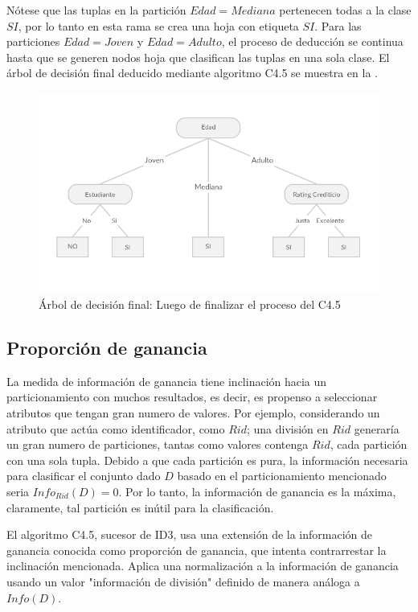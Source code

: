 Nótese que las tuplas en la partición $Edad = Mediana$ pertenecen todas a la clase $SI$, por lo tanto en esta rama se crea una hoja con etiqueta $SI$. Para las particiones $Edad = Joven$ y $Edad = Adulto$, el proceso de deducción se continua hasta que se generen nodos hoja que clasifican las tuplas en una sola clase. El
 árbol de decisión final deducido mediante algoritmo C4.5 se muestra en la .
 
\begin{figure}[!tbph]
	\centering
	\includegraphics[width=0.7\linewidth]{capitulo-3/graphics/dtree_parti_final}
	\caption[Árbol de decisión final]{\label{fig:arbolFinal}Árbol de decisión final: Luego de finalizar el proceso del C4.5 }
\end{figure}


\subsection{Proporción de ganancia}
La medida de información de ganancia tiene inclinación hacia un particionamiento con muchos resultados, es decir, es propenso a seleccionar atributos que tengan gran numero de valores. Por ejemplo, considerando un atributo que actúa como identificador, como $Rid$; una división en $Rid$ generaría un gran numero de particiones, tantas como valores contenga $Rid$, cada partición con una sola tupla. Debido a que cada partición es pura, la información necesaria para clasificar el conjunto dado $D$ basado en el particionamiento mencionado seria $Info_{Rid}(D)=0$. Por lo tanto, la información de ganancia es la máxima, claramente, tal partición es inútil para la clasificación. 

El algoritmo C4.5, sucesor de ID3, usa una extensión de la información de ganancia conocida como proporción de ganancia, que intenta contrarrestar la inclinación mencionada.	Aplica una normalización a la información de ganancia usando un valor "información de división" definido de manera análoga a $Info(D)$.

